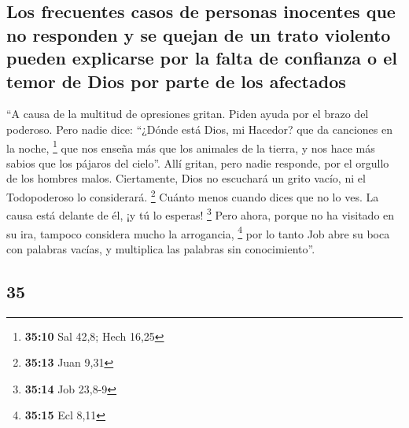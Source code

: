 \begin{paracol}{2}
\hypertarget{los-frecuentes-casos-de-personas-inocentes-que-no-responden-y-se-quejan-de-un-trato-violento-pueden-explicarse-por-la-falta-de-confianza-o-el-temor-de-dios-por-parte-de-los-afectados}{%
\subsection{Los frecuentes casos de personas inocentes que no responden
y se quejan de un trato violento pueden explicarse por la falta de
confianza o el temor de Dios por parte de los
afectados}\label{los-frecuentes-casos-de-personas-inocentes-que-no-responden-y-se-quejan-de-un-trato-violento-pueden-explicarse-por-la-falta-de-confianza-o-el-temor-de-dios-por-parte-de-los-afectados}}

 ``A causa de la multitud de opresiones gritan. Piden
ayuda por el brazo del poderoso.  Pero nadie dice:
``¿Dónde está Dios, mi Hacedor? que da canciones en la noche,
\footnote{\textbf{35:10} Sal 42,8; Hech 16,25}  que nos
enseña más que los animales de la tierra, y nos hace más sabios que los
pájaros del cielo''.  Allí gritan, pero nadie responde,
por el orgullo de los hombres malos.  Ciertamente, Dios
no escuchará un grito vacío, ni el Todopoderoso lo considerará.
\footnote{\textbf{35:13} Juan 9,31}  Cuánto menos cuando
dices que no lo ves. La causa está delante de él, ¡y tú lo esperas!
\footnote{\textbf{35:14} Job 23,8-9}  Pero ahora, porque
no ha visitado en su ira, tampoco considera mucho la arrogancia,
\footnote{\textbf{35:15} Ecl 8,11}  por lo tanto Job abre
su boca con palabras vacías, y multiplica las palabras sin
conocimiento''.

\switchcolumn
\begin{otherlanguage}{english}

\hypertarget{section-69}{%
\section{35}\label{section-69}}


\end{otherlanguage}
\end{paracol}
